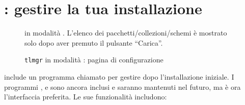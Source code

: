 \documentclass{article}
\begin{document}
\section{: gestire la tua installazione}
\label{sec:tlmgr}

\begin{figure}[tb]
\caption{ in modalità \GUI. L'elenco dei
  pacchetti/collezioni/schemi è mostrato solo dopo aver premuto il
  pulsante ``Carica''.}\label{fig:tlmgr-gui}
\end{figure}

\begin{figure}[tb]
\caption{\texttt{tlmgr} in modalità \GUI: pagina di configurazione}
\label{fig:tlmgr-config}
\end{figure}

\TL{} include un programma chiamato  per gestire \TL{} dopo
l'installazione iniziale. I programmi ,  e
 sono ancora inclusi e saranno mantenuti nel futuro, ma
 è ora l'interfaccia preferita. Le sue funzionalità includono:
\end{document}
